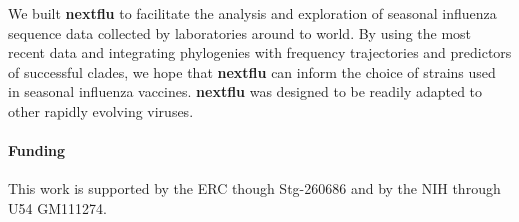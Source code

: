 \documentclass{bioinfo}
\newcommand{\nextflu}{\textbf{nextflu}}
\begin{document}
We built \nextflu{} to facilitate the analysis and exploration of seasonal influenza sequence data collected by laboratories around to world.
By using the most recent data and integrating phylogenies with frequency trajectories and predictors of successful clades, we hope that \nextflu{} can inform the choice of strains used in seasonal influenza vaccines. 
\nextflu{} was designed to be readily adapted to other rapidly evolving viruses.
 
\paragraph{Funding\textcolon}This work is supported by the ERC though Stg-260686 and by the NIH through U54 GM111274.
\end{document}
